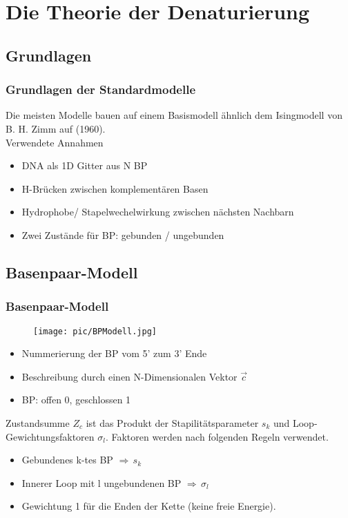 
\section[Theoretische Modelle]{Die Theorie der Denaturierung}

\subsection{Grundlagen}
\begin{frame}
\frametitle{Grundlagen der Standardmodelle}
Die meisten Modelle bauen auf einem Basismodell ähnlich dem Isingmodell von B. H. Zimm auf (1960).\\
\vspace{0.4cm}
Verwendete Annahmen
\begin{itemize}
\item DNA als 1D Gitter aus N BP
\item H-Brücken zwischen komplementären Basen
\item Hydrophobe/ Stapelwechelwirkung zwischen nächsten Nachbarn
\item Zwei Zustände für BP: gebunden / ungebunden
\end{itemize}
\end{frame}

\subsection{Basenpaar-Modell}
\begin{frame}
\frametitle{Basenpaar-Modell}
\begin{minipage}{5.2cm}
\begin{figure}[h]
	\centering
		\texttt{[image: pic/BPModell.jpg]}
\end{figure}
\centering
\tiny\cite{GOT83}
\end{minipage}
\begin{minipage}{5.0cm}
\small{
\begin{itemize}
\item Nummerierung der BP vom 5' zum 3' Ende
\item Beschreibung durch einen N-Dimensionalen Vektor $\vec{c}$ 
\item BP: offen 0, geschlossen 1
\end{itemize}
}
\end{minipage}
\vspace{0.2cm}
Zustandsumme $Z_c$ ist das Produkt der Stapilitätsparameter $s_k$ und Loop-Gewichtungsfaktoren $\sigma_l$.
Faktoren werden nach folgenden Regeln verwendet.
\begin{itemize}
\item Gebundenes k-tes BP $\Rightarrow\, s_k$
\item Innerer Loop mit l ungebundenen BP $\Rightarrow\, \sigma_l$
\item Gewichtung 1 für die Enden der Kette (keine freie Energie).
\end{itemize}
\end{frame}

